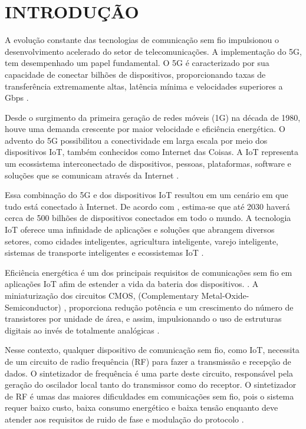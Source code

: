 \chapter{INTRODUÇÃO}\label{cap:introducao}
A evolução constante das tecnologias de comunicação sem fio impulsionou o desenvolvimento acelerado do setor de telecomunicações. A implementação do 5G, tem desempenhado um papel fundamental. O 5G é caracterizado por sua capacidade de conectar bilhões de dispositivos, proporcionando taxas de transferência extremamente altas, latência mínima e velocidades superiores a Gbps \cite{khanh2022wireless}.

Desde o surgimento da primeira geração de redes móveis (1G) na década de 1980, houve uma demanda crescente por maior velocidade e eficiência energética. O advento do 5G possibilitou a conectividade em larga escala por meio dos dispositivos IoT, também conhecidos como Internet das Coisas. A IoT representa um ecossistema interconectado de dispositivos, pessoas, plataformas, software e soluções que se comunicam através da Internet \cite{sinche2019survey}.

Essa combinação do 5G e dos dispositivos IoT resultou em um cenário em que tudo está conectado à Internet. De acordo com \cite{Cisco2020}, estima-se que até 2030 haverá cerca de 500 bilhões de dispositivos conectados em todo o mundo. A tecnologia IoT oferece uma infinidade de aplicações e soluções que abrangem diversos setores, como cidades inteligentes, agricultura inteligente, varejo inteligente, sistemas de transporte inteligentes e ecossistemas IoT \cite{khanh2022wireless}.

Eficiência energética é um dos principais requisitos de comunicações sem fio em aplicações IoT afim de estender a vida da bateria dos dispositivos. \cite{souza_2020_systemlevel}. A miniaturização dos circuitos CMOS, (Complementary Metal-Oxide-Semiconductor) \cite{khan2021nanoscale}, proporciona redução potência e um crescimento do número de transistores por unidade de área, e assim, impulsionando o uso de estruturas digitais ao invés de totalmente analógicas \cite{ferreira2020review}. 

Nesse contexto, qualquer dispositivo de comunicação sem fio, como IoT, necessita de um circuito de radio frequência (RF) para fazer a transmissão e recepção de dados. O sintetizador de frequência é uma parte deste circuito, responsável pela geração do oscilador local tanto do transmissor como do receptor. O sintetizador de RF é umas das maiores dificuldades em comunicações sem fio, pois o sistema requer baixo custo, baixa consumo energético e baixa tensão enquanto deve atender aos requisitos de ruido de fase e modulação do protocolo \cite{staszewski2006all}.

